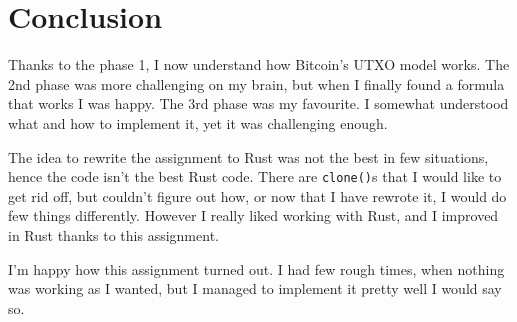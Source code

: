 \section{Conclusion}

Thanks to the phase 1, I now understand how Bitcoin's UTXO model works. The 2nd
phase was more challenging on my brain, but when I finally found a formula that
works I was happy. The 3rd phase was my favourite. I somewhat understood what
and how to implement it, yet it was challenging enough.

The idea to rewrite the assignment to Rust was not the best in few situations,
hence the code isn't the best Rust code. There are \texttt{clone()}s that I would
like to get rid off, but couldn't figure out how, or now that I have rewrote it,
I would do few things differently. However I really liked working with Rust,
and I improved in Rust thanks to this assignment.

I'm happy how this assignment turned out. I had few rough times, when nothing
was working as I wanted, but I managed to implement it pretty well I would say
so.
